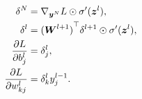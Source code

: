 \begin{align}
    \delta^N &= \nabla_{{\boldsymbol{{y}}}^N} L \odot \sigma'({\boldsymbol{{z}}}^l), \\
    \delta^l &= {({\boldsymbol{{W}}}^{l+1})}^{\top} \delta^{l+1} \odot \sigma'({\boldsymbol{{z}}}^l), \\
    \frac{\partial L}{\partial b^l_j} &= \delta^l_j, \\
    \frac{\partial L}{\partial w^l_{kj}} &= \delta^l_k y^{l-1}_j.
\end{align}







